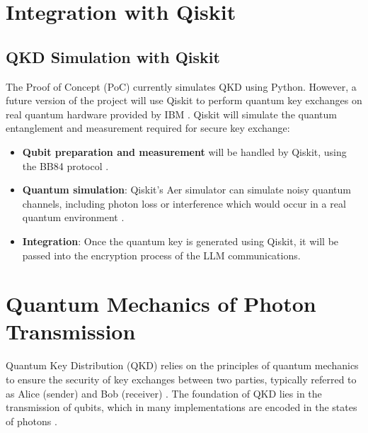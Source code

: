 \documentclass{article}
\begin{document}
\section{Integration with Qiskit}
\subsection{QKD Simulation with Qiskit}
The Proof of Concept (PoC) currently simulates QKD using Python. However, a future version of the project will use Qiskit to perform quantum key exchanges on real quantum hardware provided by IBM \parencite{nsa_2024}. Qiskit will simulate the quantum entanglement and measurement required for secure key exchange:
\begin{itemize}
    \item \textbf{Qubit preparation and measurement} will be handled by Qiskit, using the BB84 protocol \parencite{bennett1984}.
    \item \textbf{Quantum simulation}: Qiskit’s Aer simulator can simulate noisy quantum channels, including photon loss or interference which would occur in a real quantum environment \parencite{nielsen2010}.
    \item \textbf{Integration}: Once the quantum key is generated using Qiskit, it will be passed into the encryption process of the LLM communications.
\end{itemize}

\section{Quantum Mechanics of Photon Transmission}

Quantum Key Distribution (QKD) relies on the principles of quantum mechanics to ensure the security of key exchanges between two parties, typically referred to as Alice (sender) and Bob (receiver) \parencite{patel2020}. The foundation of QKD lies in the transmission of qubits, which in many implementations are encoded in the states of photons \parencite{lo2012}. 
\end{document}
